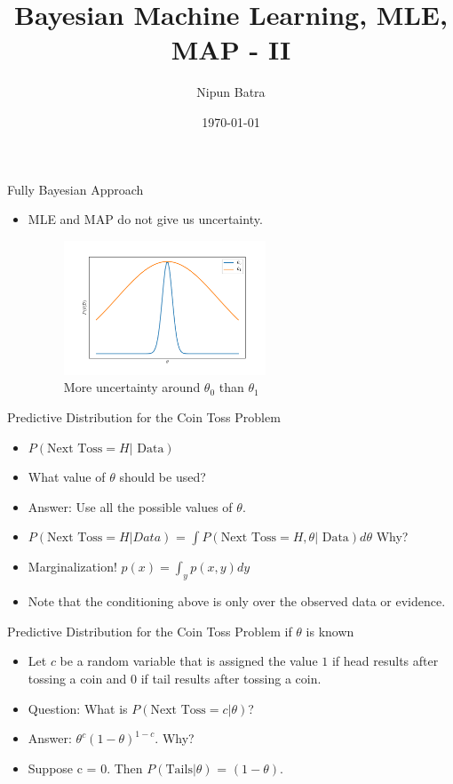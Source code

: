 \documentclass{beamer}
\title{Bayesian Machine Learning, MLE, MAP - II}
\date{\today}
\author{Nipun Batra}
\institute{IIT Gandhinagar}
\begin{document}
\maketitle
\begin{frame}{Fully Bayesian Approach}
\begin{itemize}
\item MLE and MAP do not give us uncertainty.
\begin{figure}[htp]
    \centering
    \includegraphics[width=6cm]{plots/fullybayesian1.pdf}
    \caption{More uncertainty around $\theta_0$ than $\theta_1$}
    \label{fig:online}
\end{figure}
\end{itemize}
\end{frame}


\begin{frame}{Predictive Distribution for the Coin Toss Problem}
\begin{itemize}
\item $P(\text{Next Toss} = H | \text{ Data})$
\item What value of $\theta$ should be used?
\item Answer: Use all the possible values of $\theta$.
\item  $P(\text{Next Toss} = H | Data)$ = $\int P(\text{Next Toss} = H, \theta | \text{ Data})d\theta$ Why?
\item  Marginalization! $p(x) = \int_y p(x,y)dy$
\item Note that the conditioning above is only over the observed data or evidence.
\end{itemize}
\end{frame}
\begin{frame}{Predictive Distribution for the Coin Toss Problem if $\theta$ is known}

\begin{itemize}
	
	\item Let $c$ be a random variable that is assigned the value $1$ if head results after tossing a coin and 0 if tail results after tossing a coin.
	\item  Question: What is $P(\text{Next Toss} = c | \theta)$?
	\item Answer: $\theta^c(1 - \theta)^{1-c}$. Why?
	\item Suppose c = 0. Then $P(\text{Tails} | \theta)$ = $(1 - \theta)$.
\end{itemize}
\end{frame}
\end{document}
